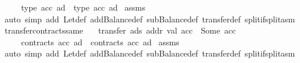 \begin{isabellebody}
\ \ \ \ \ {\isachardoublequoteopen}type\ {\isacharparenleft}{\kern0pt}acc{\isacharprime}{\kern0pt}\ ad{\isacharparenright}{\kern0pt}\ {\isacharequal}{\kern0pt}\ type\ {\isacharparenleft}{\kern0pt}acc\ ad{\isacharparenright}{\kern0pt}{\isachardoublequoteclose}\isanewline
%
\isadelimproof
%
\endisadelimproof
%
\isatagproof
{}\isamarkupfalse%
\ assms\ \isamarkupfalse%
\ {\isacharparenleft}{\kern0pt}auto\ simp\ add{\isacharcolon}{\kern0pt}\ Let{\isacharunderscore}{\kern0pt}def\ addBalance{\isacharunderscore}{\kern0pt}def\ subBalance{\isacharunderscore}{\kern0pt}def\ transfer{\isacharunderscore}{\kern0pt}def\ split{\isacharcolon}{\kern0pt}if{\isacharunderscore}{\kern0pt}split{\isacharunderscore}{\kern0pt}asm{\isacharparenright}{\kern0pt}%
\endisatagproof
{\isafoldproof}%
%
\isadelimproof
\isanewline
%
\endisadelimproof
\isanewline
{}\isamarkupfalse%
\ transfer{\isacharunderscore}{\kern0pt}contracts{\isacharunderscore}{\kern0pt}same{\isacharcolon}{\kern0pt}\isanewline
\ \ \ {\isachardoublequoteopen}transfer\ ads\ addr\ val\ acc\ {\isacharequal}{\kern0pt}\ Some\ acc{\isacharprime}{\kern0pt}{\isachardoublequoteclose}\isanewline
\ \ \ \ \ {\isachardoublequoteopen}contracts\ {\isacharparenleft}{\kern0pt}acc{\isacharprime}{\kern0pt}\ ad{\isacharparenright}{\kern0pt}\ {\isacharequal}{\kern0pt}\ contracts\ {\isacharparenleft}{\kern0pt}acc\ ad{\isacharparenright}{\kern0pt}{\isachardoublequoteclose}\isanewline
%
\isadelimproof
%
\endisadelimproof
%
\isatagproof
{}\isamarkupfalse%
\ assms\ \isamarkupfalse%
\ {\isacharparenleft}{\kern0pt}auto\ simp\ add{\isacharcolon}{\kern0pt}\ Let{\isacharunderscore}{\kern0pt}def\ addBalance{\isacharunderscore}{\kern0pt}def\ subBalance{\isacharunderscore}{\kern0pt}def\ transfer{\isacharunderscore}{\kern0pt}def\ split{\isacharcolon}{\kern0pt}if{\isacharunderscore}{\kern0pt}split{\isacharunderscore}{\kern0pt}asm{\isacharparenright}{\kern0pt}%
\endisatagproof
{\isafoldproof}%
%
\isadelimproof
\isanewline
%
\endisadelimproof
\isanewline
\isanewline
%
\isadelimtheory
\isanewline
%
\endisadelimtheory
%
\isatagtheory
{}\isamarkupfalse%
%
\endisatagtheory
{\isafoldtheory}%
%
\isadelimtheory
%
\endisadelimtheory
%
\end{isabellebody}%
\endinput
